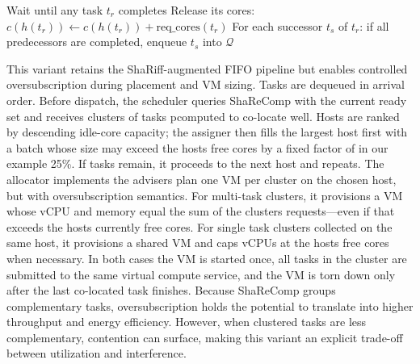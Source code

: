 \begin{algorithm}[H]
{        \BlankLine
        Wait until any task \( t_r \) completes
        Release its cores: \( c(h(t_r)) \gets c(h(t_r)) + \text{req\_cores}(t_r) \)
        For each successor \( t_s \) of \( t_r \): if all predecessors are completed, enqueue \( t_s \) into \( \mathcal{Q} \)
    }
\end{algorithm}

This variant retains the ShaRiff-augmented FIFO pipeline but enables controlled oversubscription during placement and VM sizing. Tasks are dequeued in arrival order. Before dispatch, the scheduler queries ShaReComp with the current ready set and receives clusters of tasks pcomputed to co-locate well. Hosts are ranked by descending idle-core capacity; the assigner then fills the largest host first with a batch whose size may exceed the hosts free cores by a fixed factor of in our example 25\%. If tasks remain, it proceeds to the next host and repeats.
The allocator implements the advisers plan one VM per cluster on the chosen host, but with oversubscription semantics. For multi-task clusters, it provisions a VM whose vCPU and memory equal the sum of the clusters requests—even if that exceeds the hosts currently free cores. For single task clusters collected on the same host, it provisions a shared VM and caps vCPUs at the hosts free cores when necessary. In both cases the VM is started once, all tasks in the cluster are submitted to the same virtual compute service, and the VM is torn down only after the last co-located task finishes.
Because ShaReComp groups complementary tasks, oversubscription holds the potential to translate into higher throughput and energy efficiency. However, when clustered tasks are less complementary, contention can surface, making this variant an explicit trade-off between utilization and interference.



